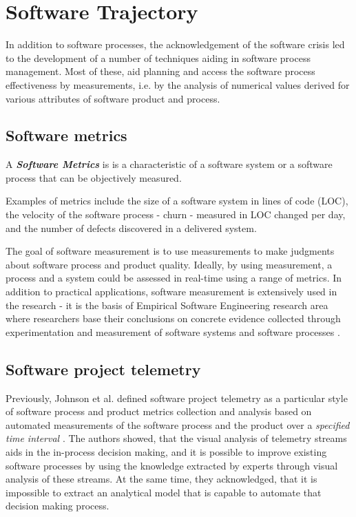%
%
\section{Software Trajectory}\label{sec_software_trajectory}
In addition to software processes, the acknowledgement of the software crisis led to the development of a number
of techniques aiding in software process management.
Most of these, aid planning and access the software process effectiveness by measurements, i.e. by the analysis of 
numerical values derived for various attributes of software product and process.

\subsection{Software metrics}\label{sec_software_metrics}
\begin{defn}\label{def_artifact}
A \textbf{\textit{Software Metrics}} is is a characteristic of a software system or a software process that can be 
objectively measured.
\end{defn}
Examples of metrics include the size of a software system in lines of code (LOC), the velocity of the software 
process - churn - measured in LOC changed per day, and the number of defects discovered in a delivered system.

The goal of software measurement is to use measurements to make judgments about software process and product quality.
Ideally, by using measurement, a process and a system could be assessed in real-time using a range of metrics. 
In addition to practical applications, software measurement is extensively used in the research - it is the basis of 
Empirical Software Engineering research area where researchers base their conclusions on concrete evidence collected 
through experimentation and measurement of software systems and software processes \cite{citeulike:766768}.


\subsection{Software project telemetry}\label{section_software_telemetry}
Previously, Johnson et al. defined software project telemetry as a particular style of software process and 
product metrics collection and analysis based on automated measurements of the software process and the product 
over a \textit{specified time interval} \cite{citeulike:557296}. 
The authors showed, that the visual analysis of telemetry streams aids in the in-process decision making, 
and it is possible to improve existing software processes by using the knowledge extracted by experts through visual 
analysis of these streams. 
At the same time, they acknowledged, that it is impossible to extract an analytical model that is capable to 
automate that decision making process.

